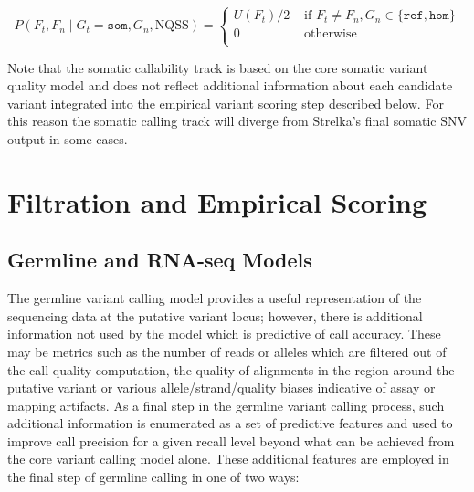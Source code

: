 \documentclass{article}
\begin{document}
\begin{equation*}
P(F_t, F_n \mid G_t = \texttt{som}, G_n, \text{NQSS})=
\begin{cases}
U(F_t)/2 & \text{ if } F_t \neq F_n, G_n \in \{\texttt{ref},\texttt{hom}\}  \\
0 & \text{ otherwise } \\
\end{cases}
\end{equation*}

Note that the somatic callability track is based on the core somatic variant quality model and does not reflect additional information about each candidate variant integrated into the empirical variant scoring step described below. For this reason the somatic calling track will diverge from Strelka's final somatic SNV output in some cases.



\section{Filtration and Empirical Scoring}


\subsection{Germline and RNA-seq Models}

The germline variant calling model provides a useful representation of the sequencing data at the putative variant locus; however, there is additional information not used by the model which is predictive of call accuracy. These may be metrics such as the number of reads or alleles which are filtered out of the call quality computation, the quality of alignments in the region around the putative variant or various allele/strand/quality biases indicative of assay or mapping artifacts. As a final step in the germline variant calling process, such additional information is enumerated as a set of predictive features and used to improve call precision for a given recall level beyond what can be achieved from the core variant calling model alone. These additional features are employed in the final step of germline calling in one of two ways:
\end{document}
